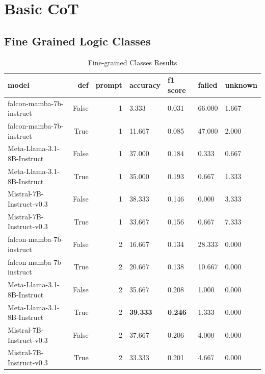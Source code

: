 


















\section{Basic CoT}

\subsection{ Fine Grained Logic Classes}
\begin{table}[H]
\centering
\caption{Fine-grained Classes Results}
\begin{tabular}{lrrllll}
\toprule
model & def & prompt & accuracy & f1 score & failed & unknown \\
\midrule
falcon-mamba-7b-instruct & False & 1 & 3.333 & 0.031 & 66.000 & 1.667 \\
falcon-mamba-7b-instruct & True & 1 & 11.667 & 0.085 & 47.000 & 2.000 \\
Meta-Llama-3.1-8B-Instruct & False & 1 & 37.000 & 0.184 & 0.333 & 0.667 \\
Meta-Llama-3.1-8B-Instruct & True & 1 & 35.000 & 0.193 & 0.667 & 1.333 \\
Mistral-7B-Instruct-v0.3 & False & 1 & 38.333 & 0.146 & 0.000 & 3.333 \\
Mistral-7B-Instruct-v0.3 & True & 1 & 33.667 & 0.156 & 0.667 & 7.333 \\
falcon-mamba-7b-instruct & False & 2 & 16.667 & 0.134 & 28.333 & 0.000 \\
falcon-mamba-7b-instruct & True & 2 & 20.667 & 0.138 & 10.667 & 0.000 \\
Meta-Llama-3.1-8B-Instruct & False & 2 & 35.667 & 0.208 & 1.000 & 0.000 \\
Meta-Llama-3.1-8B-Instruct & True & 2 & \textbf{39.333} & \textbf{0.246} & 1.333 & 0.000 \\
Mistral-7B-Instruct-v0.3 & False & 2 & 37.667 & 0.206 & 4.000 & 0.000 \\
Mistral-7B-Instruct-v0.3 & True & 2 & 33.333 & 0.201 & 4.667 & 0.000 \\
\bottomrule
\end{tabular}
\end{table}



